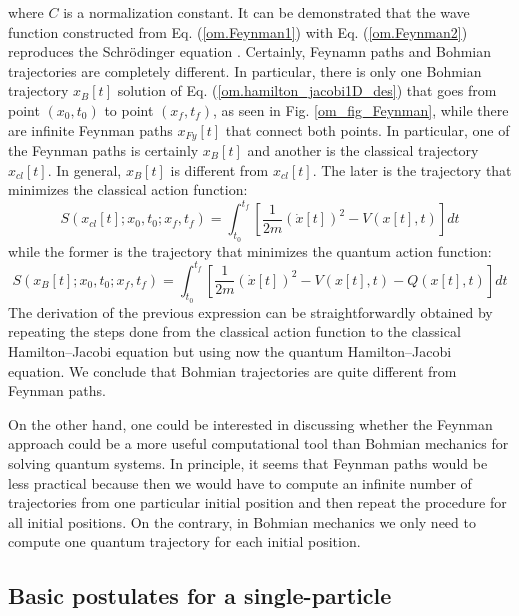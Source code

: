 \documentclass[onecolumn,nofootinbib, secnumarabic, amsmath, nobibnotes,12pt,aps,pra]{revtex4-1}
\newcommand{\fref}[1]{Fig. \ref{#1}}
\newcommand{\eref}[1]{Eq. (\ref{#1})}
\begin{document}
\noindent where $C$ is a normalization constant. It can be
demonstrated that the wave function constructed from
\eref{om.Feynman1} with \eref{om.Feynman2} reproduces the
Schr\"odinger equation \cite{om.feynmann1965}. Certainly, Feynamn
paths and Bohmian trajectories are completely different. In
particular, there is only one Bohmian trajectory $x\!_{B}[t]$ solution
of \eref{om.hamilton_jacobi1D_des} that goes from point $(x_0,t_0)$
to point $(x\!_f,t\!_f)$, as seen in \fref{om_fig_Feynman}, while there
are infinite Feynman paths $x_\textit{Fy}[t]$ that connect both points. In
particular, one of the Feynman paths is certainly $x\!_{B}[t]$ and
another is the classical trajectory $x_{cl}[t]$. In general,
$x\!_{B}[t]$ is different from $x_{cl}[t]$. The later is the
trajectory that minimizes the classical action function:
\begin{equation}
\label{om.action_function_clas}
 S(x_{cl}[t];x_0,t_0;x_f,t_f) = \int_{t_0}^{t_f} \left[ \frac {1} {2m} (\dot{x}[t])^2 -V(x[t],t) \right] dt
\end{equation}
while the former is the trajectory that minimizes the quantum action function:
\begin{equation}
\label{om.action_function_quan}
 S(x_{B}[t];x_0,t_0;x_f,t_f) =\! \int_{t_0}^{t_f} \left[ \frac {1} {2m} (\dot{x}[t])^2 -V(x[t],t) -Q(x[t],t) \right] dt
\end{equation}
The derivation of the previous expression can be straightforwardly obtained by repeating the steps done from the classical action function to the classical Hamilton--Jacobi equation but using now the quantum Hamilton--Jacobi equation. We conclude that Bohmian trajectories are quite different from Feynman paths.


On the other hand, one could be interested in discussing whether the Feynman approach could be a more useful computational tool than Bohmian mechanics for solving quantum systems. In principle, it seems that Feynman paths would be less practical because then we would have to compute an infinite number of trajectories from one particular initial position and then repeat the procedure for all initial positions. On the contrary, in Bohmian mechanics we only need to compute one quantum trajectory for each initial position.


\subsection{Basic postulates  for a single-particle}\label{om.sec_single.6}
\end{document}
